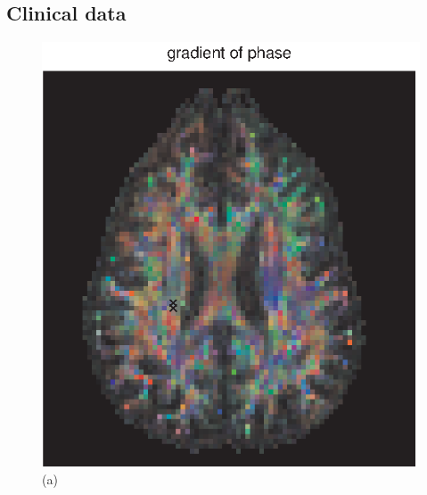 \documentclass[authoryear,preprint,12pt]{elsarticle}
\begin{document}
\subsection{Clinical data}

\begin{figure}[p]
  \begin{center}
    \begin{minipage}[]{.42\textwidth}
      \centering
      \includegraphics[width=\textwidth]{gradphasebu.eps}
      (a)
      \end{minipage}
      \begin{minipage}[]{.42\textwidth}
      \centering

\end{minipage}
\end{center}
\end{figure}
\end{document}

